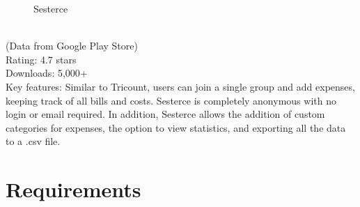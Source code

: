 \documentclass[conference]{IEEEtran}
\begin{document}
\begin{enumerate}
\begin{figure}[htbp]
            \caption{Sesterce}
            \label{fig:sesterce-logo}
        \end{figure}
        \\
        (Data from Google Play Store) \\
        Rating: 4.7 stars \\
        Downloads: 5,000+ \\
        Key features: Similar to Tricount, users can join a single group and add expenses, keeping track of all bills and costs. Sesterce is completely anonymous with no login or email required. In addition, Sesterce allows the addition of custom categories for expenses, the option to view statistics, and exporting all the data to a .csv file.
\end{enumerate}

\section{Requirements}
\end{document}
